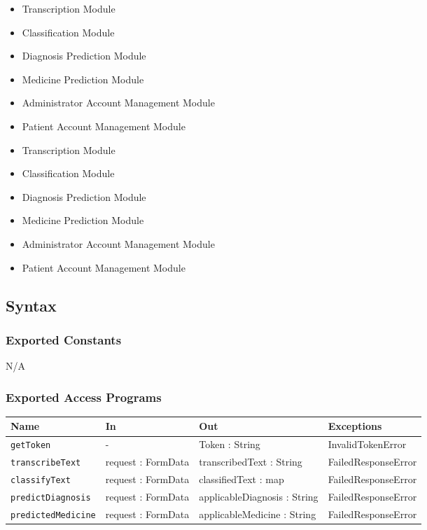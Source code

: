\documentclass[12pt, titlepage]{article}
\begin{document}
\begin{itemize}
  \item Transcription Module
  \item Classification Module
  \item Diagnosis Prediction Module
  \item Medicine Prediction Module
  \item Administrator Account Management Module
  \item Patient Account Management Module
\end{itemize}
\begin{itemize}
  \item Transcription Module
  \item Classification Module
  \item Diagnosis Prediction Module
  \item Medicine Prediction Module
  \item Administrator Account Management Module
  \item Patient Account Management Module
\end{itemize}

\subsection{Syntax}

\subsubsection{Exported Constants}
N/A

\subsubsection{Exported Access Programs}

\begin{center}
\begin{tabular}{p{3cm} p{4cm} p{4cm} p{3.5cm}}
\hline
\textbf{Name} & \textbf{In} & \textbf{Out} & \textbf{Exceptions} \\
\hline
\texttt{getToken} & - & Token : String & InvalidTokenError \\
\texttt{transcribeText} & request : FormData & transcribedText : String & FailedResponseError \\
\texttt{classifyText} & request : FormData & classifiedText : map  & FailedResponseError \\
\texttt{predictDiagnosis} & request : FormData & applicableDiagnosis : String & FailedResponseError \\
\texttt{predictedMedicine} & request : FormData & applicableMedicine : String & FailedResponseError \\
\hline
\end{tabular}
\end{center}
\end{document}
